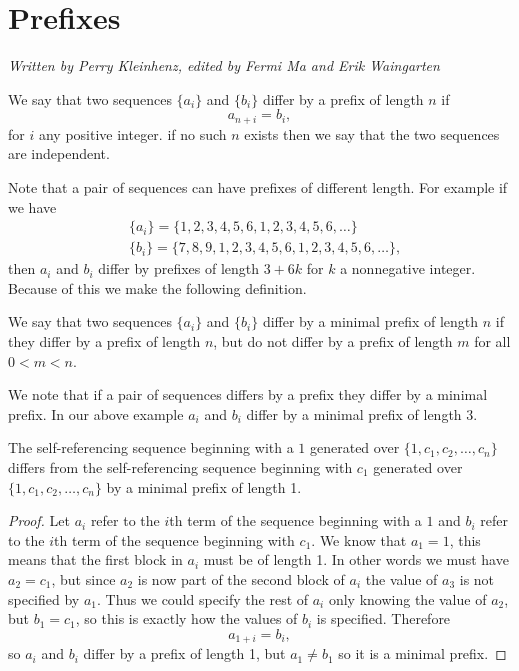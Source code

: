 \documentclass[runningheads,a4paper]{llncs}
\begin{document}
\section{Prefixes}
\label{prefixes}
\emph{Written by Perry Kleinhenz, edited by Fermi Ma and Erik Waingarten}
\begin{definition} We say that two sequences $\{a_i\}$ and $\{b_i\}$ differ by a prefix of length $n$ if 
\begin{equation*}
a_{n+i} = b_{i},
\end{equation*}
for $i$ any positive integer. if no such $n$ exists then we say that the two sequences are independent.
\end{definition}
Note that a pair of sequences can have prefixes of different length. For example if we have 
\begin{align*}
&\{a_i\} = \{1,2,3,4,5,6,1,2,3,4,5,6, \ldots \} \\  
&\{b_i\}= \{7,8,9,1,2,3,4,5,6,1,2,3,4,5,6, \ldots\},
\end{align*}
 then $a_i$ and $b_i$ differ by prefixes of length $3+6k$ for $k$ a nonnegative integer. Because of this we make the following definition.
 \begin{definition} 
 We say that two sequences $\{a_i\}$ and $\{b_i\}$ differ by a minimal prefix of length $n$ if they differ by a prefix of length $n$, but do not differ by a prefix of length $m$ for all $0<m<n$.
 \end{definition}
We note that if a pair of sequences differs by a prefix they differ by a minimal prefix. In our above example $a_i$ and $b_i$ differ by a minimal prefix of length $3$. 
 
\begin{theorem} The self-referencing sequence beginning with a $1$ generated over $\{1, c_1, c_2, \ldots, c_n\}$ differs from the self-referencing sequence beginning with $c_1$ generated over $\{1, c_1, c_2, \ldots, c_n\}$ by a minimal prefix of length 1.
\end{theorem}
\begin{proof}
Let $a_i$ refer to the $i$th term of the sequence beginning with a $1$ and $b_i$ refer to the $i$th term of the sequence beginning with $c_1$. We know that $a_1=1$, this means that the first block in $a_i$ must be of length 1. In other words we must have $a_2=c_1$, but since $a_2$ is now part of the second block of $a_i$ the value of $a_3$ is not specified by $a_1$. Thus we could specify the rest of $a_i$ only knowing the value of $a_2$, but $b_1=c_1$, so this is exactly how the values of $b_i$ is specified. Therefore
\begin{equation*}
a_{1+i} = b_{i},
\end{equation*}
so $a_i$ and $b_i$ differ by a prefix of length 1, but $a_{1} \neq b_{1}$ so it is a minimal prefix. 
\end{proof}
\end{document}
